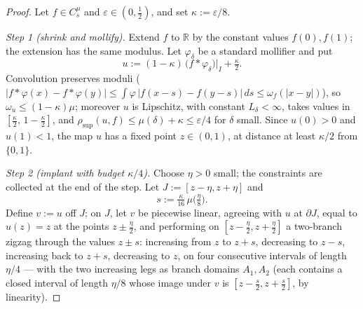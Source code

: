 \documentclass[11pt]{article}
\newcommand{\I}{I}
\newcommand{\rsup}{\rho_{\sup}}
\begin{document}
\begin{proof}
Let $f\in C^\mu_s$ and $\varepsilon\in(0,\tfrac12)$, and set
$\kappa:=\varepsilon/8$.

\emph{Step 1 (shrink and mollify).}  Extend $f$ to $\mathbb R$ by the constant
values $f(0),f(1)$; the extension has the same modulus.  Let
$\varphi_\delta$ be a standard mollifier and put
\[
u:=(1-\kappa)\,\bigl(f*\varphi_\delta\bigr)\big|_\I+\tfrac\kappa2 .
\]
Convolution preserves moduli
($|f*\varphi(x)-f*\varphi(y)|\le\int\varphi\,|f(x-s)-f(y-s)|\,ds\le\omega_f(|x-y|)$),
so $\omega_u\le(1-\kappa)\mu$; moreover $u$ is Lipschitz, with constant
$L_\delta<\infty$, takes values in $[\tfrac\kappa2,\,1-\tfrac\kappa2]$, and
$\rsup(u,f)\le\mu(\delta)+\kappa\le\varepsilon/4$ for $\delta$ small.  Since
$u(0)>0$ and $u(1)<1$, the map $u$ has a fixed point $z\in(0,1)$, at distance at
least $\kappa/2$ from $\{0,1\}$.

\emph{Step 2 (implant with budget $\kappa/4$).}  Choose $\eta>0$ small; the
constraints are collected at the end of the step.  Let
$J:=[z-\eta,z+\eta]$ and
\[
s:=\tfrac\kappa{16}\,\mu\bigl(\tfrac\eta8\bigr).
\]
Define $v:=u$ off $J$; on $J$, let $v$ be piecewise linear, agreeing with $u$ at
$\partial J$, equal to $u(z)=z$ at the points $z\pm\tfrac\eta2$, and performing on
$[z-\tfrac\eta2,z+\tfrac\eta2]$ a two-branch zigzag through the values
$z\pm s$: increasing from $z$ to $z+s$, decreasing to $z-s$, increasing back to
$z+s$, decreasing to $z$, on four consecutive intervals of length $\eta/4$ ---
with the two increasing legs as branch domains $A_1,A_2$ (each contains a closed
interval of length $\eta/8$ whose image under $v$ is $[z-\tfrac s2,z+\tfrac s2]$,
by linearity).


\end{proof}
\end{document}
